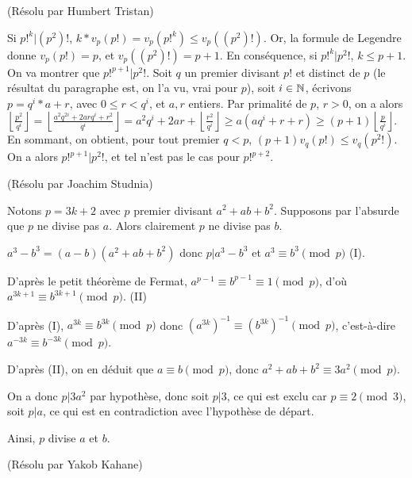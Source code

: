 \begin{sol}[75]
\begin{sol}[64](R\'esolu par Humbert Tristan)

		Si $p!^k | (p^2)!$, $k*v_p(p!) = v_p(p!^k) \leq v_p((p^2)!)$. 
		Or, la formule de Legendre donne $v_p(p!)=p$, et $v_p((p^2)!)=p+1$. En cons\'equence, si $p!^k | p^2!$, $k \leq p+1$. \\
		On va montrer que $p!^{p+1} | p^2!$. Soit $q$ un premier divisant $p!$ et distinct de $p$ (le r\'esultat du paragraphe est, on l'a vu, vrai pour $p$), soit $i \in \mathbb{N}$, \'ecrivons $p=q^i*a+r$, avec $0 \leq r < q^i$, et $a,r$ entiers. Par primalit\'e de $p$, $r > 0$, on a alors \\ $\left\lfloor \frac{p^2}{q^i}\right\rfloor = \left\lfloor \frac{a^2q^{2i}+2arq^i+r^2}{q^i}\right\rfloor=a^2q^i+2ar+\left\lfloor \frac{r^2}{q^i}\right\rfloor \geq a(aq^i+r+r) \geq (p+1) \left\lfloor \frac{p}{q^i}\right\rfloor$. En sommant, on obtient, pour tout premier $q < p$, $(p+1)v_q(p!) \leq v_q(p^2!)$. \\
		On a alors $p!^{p+1} | p^2!$, et tel n'est pas le cas pour $p!^{p+2}$. 
\end{sol}

\begin{sol}[126](Résolu par Joachim Studnia)

Notons $p=3k+2$ avec $p$ premier divisant $a^2+ab+b^2$. Supposons par l'absurde que $p$ ne divise pas $a$. Alors clairement $p$ ne divise pas $b$.

$a^3-b^3 = (a-b)(a^2+ab+b^2)$ donc $p | a^3-b^3$ et $a^3 \equiv b^3 \pmod p$ (I).

D'après le petit théorème de Fermat, \mbox{$a^{p-1} \equiv b^{p-1} \equiv 1 \pmod p$}, d'où \mbox{$a^{3k+1} \equiv b^{3k+1} \pmod p$}. (II)

D'après (I), $a^{3k} \equiv b^{3k} \pmod p$ donc $(a^{3k})^{-1} \equiv (b^{3k})^{-1} \pmod p$, c'est-à-dire $a^{-3k} \equiv b^{-3k} \pmod p$.

D'après (II), on en déduit que $a \equiv b \pmod p$, donc \mbox{$a^2+ab+b^2 \equiv 3a^2 \pmod p$}.

On a donc $p | 3a^2$ par hypothèse, donc soit $p | 3$, ce qui est exclu car \mbox{$p \equiv 2 \pmod 3$}, soit $p |a$, ce qui est en contradiction avec l'hypothèse de départ.

Ainsi, $p$ divise $a$ et $b$.

\end{sol}

\begin{sol}[133](Résolu par Yakob Kahane)


\end{sol}
\end{sol}

